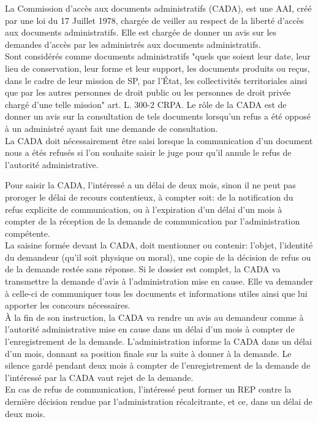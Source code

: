 \documentclass[10pt, a4paper, openany]{book}
\begin{document}
La Commission d'accès aux documents administratifs (CADA), est une AAI, créé par une loi du 17 Juillet 1978, chargée de veiller au respect de la liberté d'accès aux documents administratifs. Elle est chargée de donner un avis sur les demandes d'accès par les administrés aux documents administratifs. \\
Sont considérés comme documents administratifs "quels que soient leur date, leur lieu de conservation, leur forme et leur support, les documents produits ou reçus, dans le cadre de leur mission de SP, par l'État, les collectivités territoriales ainsi que par les autres personnes de droit public ou les personnes de droit privée chargé d'une telle mission" art. L. 300-2 CRPA. Le rôle de la CADA est de donner un avis sur la consultation de tels documents lorsqu'un refus a été opposé à un administré ayant fait une demande de consultation. \\
La CADA doit nécessairement être saisi lorsque la communication d'un document nous a étés refusés si l'on souhaite saisir le juge pour qu'il annule le refus de l'autorité administrative. 


Pour saisir la CADA, l'intéressé a un délai de deux mois, sinon il ne peut pas proroger le délai de recours contentieux, à compter soit: de la notification du refus explicite de communication, ou à l'expiration d'un délai d'un mois à compter de la réception de la demande de communication par  l'administration compétente. \\
La saisine formée devant la CADA, doit mentionner ou contenir: l'objet, l'identité du demandeur (qu'il soit physique ou moral), une copie de la décision de refus ou de la demande restée sans réponse. Si le dossier est complet, la CADA va transmettre la demande d'avis à l'administration mise en cause. Elle va demander à celle-ci de communiquer tous les documents et informations utiles ainsi que lui apporter les concours nécessaires. \\
À la fin de son instruction, la CADA va rendre un avis au demandeur comme à l'autorité administrative mise en cause dans un délai d'un mois à compter de l'enregistrement de la demande. L'administration informe la CADA dans un délai d'un mois, donnant sa position finale sur la suite à donner à la demande. Le silence gardé pendant deux mois à compter de l'enregistrement de la demande de l'intéressé par la CADA vaut rejet de la demande. \\
En cas de refus de communication, l'intéressé peut former un REP contre la dernière décision rendue par l'administration récalcitrante, et ce, dans un délai de deux mois. 
\end{document}
